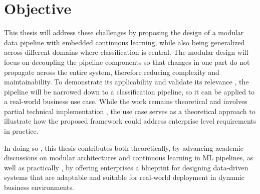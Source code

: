 %
%
\section{Objective}
\label{sec:intro:objective}
This thesis will address these challenges by proposing the design of a modular data pipeline with embedded continuous learning, while also being generalized across different domains where classification is central. The modular design will focus on decoupling the pipeline components \cite{sculley:2015} so that changes in one part do not propagate across the entire system, therefore reducing complexity and maintainability. To demonstrate its applicability and validate its relevance , the pipeline will be narrowed down to a classification pipeline, so it can be applied to a real-world business use case. While the work remains theoretical and involves partial technical implementation , the use case serves as a theoretical approach to illustrate how the proposed framework could address enterprise level requirements in practice.
\smallskip

In doing so , this thesis contributes both theoretically, by advancing academic discussions on modular architectures and continuous learning in ML pipelines, as well as practically , by offering enterprises a blueprint for designing data-driven systems that are adaptable and suitable for real-world deployment in dynamic business environments.


